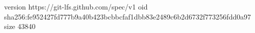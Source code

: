 version https://git-lfs.github.com/spec/v1
oid sha256:fe952427fd777b9a40b423bcbbcfaf1dbb83e2489c6b2d6732f773256fdd0a97
size 43840
